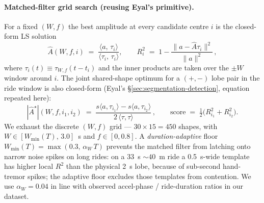 \paragraph{Matched-filter grid search (reusing Eyal's primitive).}
For a fixed $(W,f)$ the best amplitude at every candidate centre $i$
is the closed-form LS solution
\begin{equation}
  \hat{A}(W,f,i) \;=\; \frac{\langle a,\,\tau_i\rangle}{\langle \tau_i,\,\tau_i\rangle},
  \qquad
  R^2_i \;=\; 1-\frac{\lVert a-\hat{A}\tau_i\rVert^2}{\lVert a\rVert^2}\,,
  \label{eq:matched-filter}
\end{equation}
where $\tau_i(t)\equiv\tau_{W,f}(t-t_i)$ and the inner products are
taken over the $\pm W$ window around $i$. The joint shared-shape
optimum for a $(+,-)$ lobe pair in the ride window is also
closed-form (Eyal's \S\ref{sec:segmentation-detection}, equation
repeated here):
\begin{equation}
  |\hat{A}^{\star}|(W,f,i_1,i_2)
  \;=\;
  \frac{s\langle a,\tau_{i_1}\rangle -s\langle a,\tau_{i_2}\rangle}
       {2\,\langle\tau,\tau\rangle}\,,
  \qquad
  \text{score} \;=\; \tfrac{1}{2}\bigl(R^2_{i_1}+R^2_{i_2}\bigr).
  \label{eq:constrained-matched-filter}
\end{equation}
We exhaust the discrete $(W,f)$ grid —
$30\!\times\!15=450$ shapes, with $W\in[W_{\min}(T),\,3.0]$~s and
$f\in[0,0.8]$. A \emph{duration-adaptive} floor
$W_{\min}(T)=\max(0.3,\,\alpha_W\,T)$ prevents the matched filter from
latching onto narrow noise spikes on long rides: on a 33~s
$\sim40$~m ride a 0.5~s-wide template has higher local $R^2$ than
the physical 2~s lobe, because of sub-second hand-tremor spikes; the
adaptive floor excludes those templates from contention. We use
$\alpha_W=0.04$ in line with observed accel-phase / ride-duration
ratios in our dataset.

